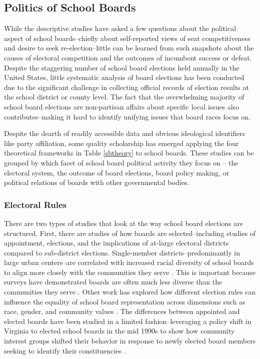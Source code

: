 \subsection{Politics of School Boards}

While the descriptive studies have asked a few questions about the political 
aspect of school boards--chiefly about self-reported views of seat competitiveness 
and desire to seek re-election--little can be learned from such snapshots about 
the causes of electoral competition and the outcomes of incumbent success or 
defeat. Despite the staggering number of school board elections held annually in 
the United States, little systematic analysis of board elections has been conducted 
due to the significant challenge in collecting official records of election results 
at the school district or county level. The fact that the overwhelming majority 
of school board elections are non-partisan affairs about specific local issues 
also contributes--making it hard to identify unifying issues that board races focus 
on.

Despite the dearth of readily accessible data and obvious ideological identifiers 
like party affiliation, some quality scholarship has emerged applying the four 
theoretical frameworks in Table \ref{sbtheory} to school boards. These studies 
can be grouped by which facet of school board political activity they focus on 
-- the electoral system, the outcome of board elections, board policy making, or 
political relations of boards with other governmental bodies. 

\subsubsection{Electoral Rules}
There are two types of studies that look at the way school board elections are 
structured. First, there are studies of how boards are selected--including studies 
of appointment, elections, and the implications of at-large electoral districts 
compared to sub-district elections. Single-member districts--predominantly in large 
urban centers--are correlated with increased racial diversity of school boards to 
align more closely with the communities they serve \citep{RefWorks:195,RefWorks:238}. 
This is important because surveys have demonstrated boards are often much less 
diverse than the communities they serve \citep{RefWorks:321,RefWorks:322}. Other 
work has explored how different election rules can influence the equality of school 
board representation across dimensions such as race, gender, and community values 
\citep{RefWorks:241,RefWorks:238}. The differences between appointed and 
elected boards have been studied in a limited fashion--leveraging a policy shift 
in Virginia to elected school boards in the mid 1990s to show how community interest 
groups shifted their behavior in response to newly elected board members seeking 
to identify their constituencies \citep{RefWorks:315,RefWorks:242}. 

